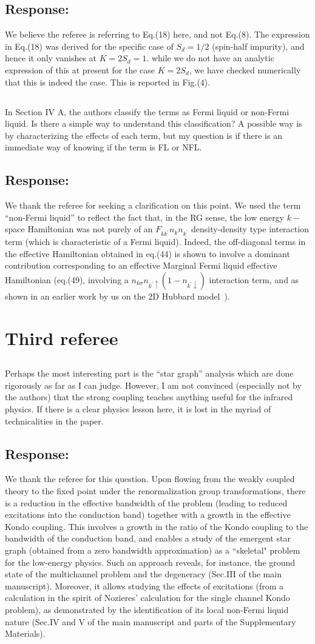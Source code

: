 \documentclass{article}
\newcommand{\response}[1]{{\color{blue}\subsection*{Response:}{#1}}}
\newcommand{\point}[1]{\subsection{}{#1}}
\begin{document}
\response{We believe the referee is referring to Eq.(18) here, and not Eq.(8). The expression in Eq.(18) was derived for the specific case of $S_d = 1/2$ (spin-half impurity), and hence it only vanishes at $K=2S_d=1$. while we do not have an analytic expression of this at present for the case $K=2S_{d}$, we have checked numerically that this is indeed the case. This is reported in Fig.(4).}

\point{
In Section IV A, the authors classify the terms as Fermi liquid or non-Fermi liquid. Is there a simple way to understand this classification? A possible way is by characterizing the effects of each term, but my question is if there is an immediate way of knowing if the term is FL or NFL.}

\response{ We thank the referee for seeking a clarification on this point. We used the term “non-Fermi liquid” to reflect the fact that, in the RG sense, the low energy $k−$space Hamiltonian was not purely of an $F_{kk^\prime} n_k n_{k^\prime}$ density-density type interaction term (which is characteristic of a Fermi liquid). Indeed, the off-diagonal terms in the effective Hamiltonian obtained in eq.(44) is shown to involve a dominant contribution corresponding to an effective Marginal Fermi liquid effective Hamiltonian (eq.(49), involving a $n_{k\sigma} n_{k^{\prime}\uparrow}(1-n_{k^{\prime}\downarrow})$ interaction term, and as shown in an earlier work by us on the 2D Hubbard model~\cite{anirbanmott1,anirbanmott2,anirbanurg1,anirbanurg2}).} 

\section{Third referee}

\point{
Perhaps the most interesting part is the “star graph” analysis which
are done rigorously as far as I can judge. However, I am not convinced
(especially not by the authors) that the strong coupling teaches
anything useful for the infrared physics. If there is a clear physics
lesson here, it is lost in the myriad of technicalities in the paper.
}

\response{We thank the referee for this question. Upon flowing from the weakly coupled theory to the fixed point under the renormalization group transformations, there is a reduction in the effective bandwidth of the problem (leading to reduced excitations into the conduction band) together with a growth in the effective Kondo coupling. This involves a growth in the ratio of the Kondo coupling to the bandwidth of the conduction band, and enables a study of the emergent star graph (obtained from a zero bandwidth approximation) as a ``skeletal" problem for the low-energy physics. Such an approach reveals, for instance, the ground state of the multichannel problem and the degeneracy (Sec.III of the main manuscript). Moreover, it allows studying the effects of excitations (from a calculation in the spirit of Nozieres' calculation for the single channel Kondo problem), as demonstrated by the identification of its local non-Fermi liquid nature (Sec.IV and V of the main manuscript and parts of the Supplementary Materials).
}
\end{document}
